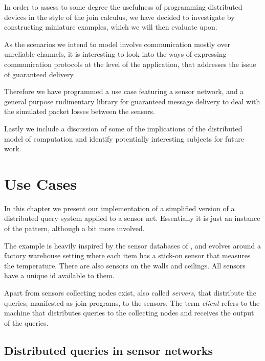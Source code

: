 
In order to assess to some degree the usefulness of programming distributed
devices in the style of the join calculus, we have decided to investigate by
constructing miniature examples, which we will then evaluate upon.

As the scenarios we intend to model involve communication mostly over
unreliable channels, it is interesting to look into the ways of
expressing communication protocols at the level of the application,
that addresses the issue of guaranteed delivery.

Therefore we have programmed a use case featuring a sensor network,
and a general purpose rudimentary library for guaranteed message
delivery to deal with the simulated packet losses between the sensors.

Lastly we include a discussion of some of the implications of the distributed
model of computation and identify potentially interesting subjects for future
work.





\section{Use Cases}

In this chapter we present our implementation of a simplified version of a
distributed query system applied to a sensor net. Essentially it is just an
instance of the  pattern, although a bit more involved.

The example is heavily inspired by the sensor databases of
\cite{bonnet2001towards}, and evolves around a factory warehouse setting where
each item has a stick-on sensor that measures the temperature. There are also
sensors on the walls and ceilings. All sensors have a unique id available to
them.

Apart from sensors collecting nodes exist, also called \emph{servers}, that
distribute the queries, manifested as join programs, to the sensors. The term
\emph{client} refers to the machine that distributes queries to the collecting
nodes and receives the output of the queries.

\subsection*{Distributed queries in sensor networks}

